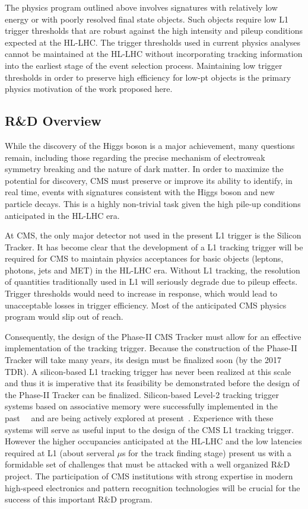 The physics program outlined above involves signatures with relatively low energy or with poorly resolved final state objects. Such objects require low L1 trigger thresholds that are robust against the high intensity and pileup conditions expected at the HL-LHC. The trigger thresholds used in current physics analyses cannot be maintained at the HL-LHC without incorporating tracking information into the earliest stage of the event selection process. Maintaining low trigger thresholds in order to preserve high efficiency for low-pt objects is the primary physics motivation of the work proposed here.



\subsection{R\&D Overview}


\noindent 

While the discovery of the Higgs boson is a major achievement, many questions remain, including those regarding the precise mechanism of electroweak symmetry breaking and the nature of dark matter. In order to maximize the potential for discovery, CMS must preserve or improve its ability to identify, in real time, events with signatures consistent with the Higgs boson and new particle decays. This is a highly non-trivial task given the high pile-up conditions anticipated in the HL-LHC era.

At CMS, the only major detector not used in the present L1 trigger is the Silicon Tracker. It has become clear that the development of a L1 tracking trigger will be required for CMS to maintain physics acceptances for basic objects (leptons, photons, jets and MET) in the HL-LHC era. Without L1 tracking, the resolution of quantities traditionally used in L1 will seriously degrade due to pileup effects.  Trigger thresholds would need to increase in response, which would lead to unacceptable losses in trigger efficiency.  Most of the anticipated CMS physics program would slip out of reach.

Consequently, the design of the Phase-II CMS Tracker must allow for an effective implementation of the tracking trigger.  Because the construction of the Phase-II Tracker will take many years, its design must be finalized soon (by the 2017 TDR).  A silicon-based L1 tracking trigger has never been realized at this scale and thus it is imperative that its feasibility be demonstrated before the design of the Phase-II Tracker can be finalized.  Silicon-based Level-2 tracking trigger systems based on associative memory were successfully implemented in the past~\cite{bib:Rist-89}~\cite{bib:Ade-07} and are being actively explored at present~\cite{bib:FTK-TDR}. Experience with these systems will serve as useful input to the design of the CMS L1 tracking trigger. However the higher occupancies anticipated at the HL-LHC and the low latencies required at L1 (about serveral $\mu$s for the track finding stage) present us with a formidable set of challenges that must be attacked with a well organized R\&D project. The participation of CMS institutions with strong expertise in modern high-speed electronics and pattern recognition technologies will be crucial for the success of this important R\&D program. 

